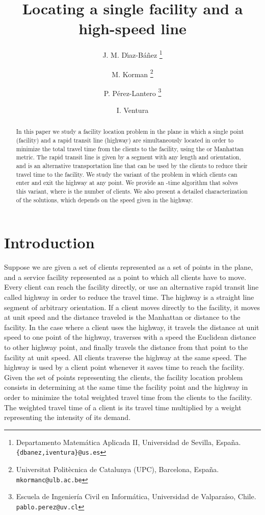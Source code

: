\documentclass[11pt,a4paper,oneside,onecolumn]{article}
\begin{document}
\title{Locating a single facility and a high-speed line}

\author{
	J. M. D\'{\i}az-B\'{a}\~{n}ez
	\thanks{Departamento Matem\'{a}tica Aplicada II, Universidad de Sevilla, Espa\~na. 
	{\tt \{dbanez,iventura\}@us.es}} \and 
	M. Korman
	\thanks{Universitat Polit\`{e}cnica de Catalunya (UPC), Barcelona, Espa\~na.
	{\tt mkormanc@ulb.ac.be}} \and
	P. P\'{e}rez-Lantero
	\thanks{Escuela de Ingenier\'ia Civil en Inform\'atica, Universidad de Valpara\'{i}so, Chile.
	{\tt pablo.perez@uv.cl}} \and
	I. Ventura\footnotemark[1]
} 

\maketitle

\begin{abstract}
In this paper we study a facility location problem in the plane in
which a single point (facility) and a rapid transit line (highway)
are simultaneously located in order to minimize the total travel
time from the clients to the facility, using the  or Manhattan
metric. The rapid transit line is given by a segment with any length
and orientation, and is an alternative transportation line
that can be used by the clients to reduce their travel time to the
facility. We study the variant of the problem in which clients can
enter and exit the highway at any point. We provide an -time
algorithm that solves this variant, where  is the number
of clients. We also present a detailed characterization of the solutions,
which depends on the speed given in the highway.
\end{abstract}
    




\section{Introduction}\label{section:intro}

Suppose we are given a set of clients represented as a set of points in
the plane, and a service facility represented as a point to which
all clients have to move. Every client can reach the facility
directly, or use an alternative rapid transit line called highway in order to reduce the
travel time. The highway is a straight line segment of arbitrary
orientation.
If a client moves
directly to the facility, it moves at unit speed and the distance
traveled is the Manhattan or  distance to the facility. In the
case where a client uses the highway, it travels the  distance
at unit speed to one point of the highway, traverses with a speed
 the Euclidean distance to other highway point, and
finally travels the  distance from that point to the facility
at unit speed. All clients traverse the highway at the same speed.
The highway is used by a client point whenever it saves time to reach
the facility.
Given the set of points representing the clients, the facility
location problem consists in determining at the same time the
facility point and the highway in order to minimize the total
weighted travel time from the clients to the facility. The weighted
travel time of a client is its travel time multiplied by a weight
representing the intensity of its demand.
\end{document}
